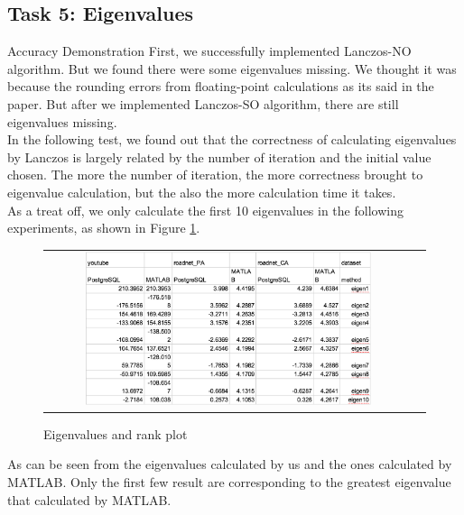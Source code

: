 \subsection{Task 5: Eigenvalues}
{Accuracy Demonstration}
First, we successfully implemented Lanczos-NO algorithm. But we found there were some eigenvalues missing. We thought it was because the rounding errors from floating-point calculations as its said in the paper. But after we implemented Lanczos-SO algorithm, there are still eigenvalues missing. \\
In the following test, we found out that the correctness of calculating eigenvalues by Lanczos is largely related by the number of iteration and the initial value chosen. The more the number of iteration, the more correctness brought to eigenvalue calculation, but the also the more calculation time it takes. \\
As a treat off, we only calculate the first 10 eigenvalues in the following experiments, as shown in Figure \ref{fig:results5-1}.\\
\begin{figure}[htbf]
\begin{center}
\begin{tabular}{cc}
     \includegraphics[width=0.8\textwidth]{FIG/tab.png} \\
\end{tabular}
\caption{Eigenvalues and rank plot}
\label{fig:results5-1}
\end{center}
\end{figure}
As can be seen from the eigenvalues calculated by us and the ones calculated by MATLAB. Only the first few result are corresponding to the greatest eigenvalue that calculated by MATLAB. \\
